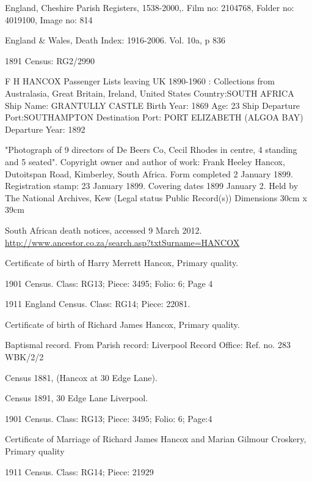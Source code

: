 \begin{thebibliography}{99}
	England, Cheshire Parish Registers, 1538-2000,.
	Film no: 2104768, Folder no: 4019100, Image no: 814
	
	England \& Wales, Death Index: 1916-2006.
	Vol. 10a, p 836
	
	 1891 Census: RG2/2990
	 
	F H HANCOX 
   	Passenger Lists leaving UK 1890-1960 : Collections from Australasia, Great Britain, Ireland, United States
	Country:SOUTH AFRICA
	Ship Name: GRANTULLY CASTLE
	Birth Year: 1869  Age: 23
	Ship Departure Port:SOUTHAMPTON
	Destination Port: PORT ELIZABETH (ALGOA BAY)
	Departure Year: 1892
	
	"Photograph of 9 directors of De Beers Co, Cecil Rhodes in centre, 4 standing and 5 seated".
	Copyright owner and author of work: Frank Heeley Hancox, Dutoitspan Road, Kimberley, South Africa.
	Form completed 2 January 1899. Registration stamp: 23 January 1899.
	Covering dates 1899 January 2. Held by The National Archives, Kew (Legal status Public Record(s))
	Dimensions 30cm x 39cm

	South African death notices, accessed 9 March 2012.
	\url{http://www.ancestor.co.za/search.asp?txtSurname=HANCOX}
	
	Certificate of birth of Harry Merrett Hancox, Primary quality.
	
	1901 Census. Class: RG13; Piece: 3495; Folio: 6; Page 4
	
	1911 England Census. Class: RG14; Piece: 22081.
	
	Certificate of birth of Richard James Hancox, Primary quality.
	
	 Baptismal record. From Parish record: Liverpool Record Office: Ref. no. 283 WBK/2/2
	 
	Census 1881, (Hancox at 30 Edge Lane).
	
	Census 1891, 30 Edge Lane Liverpool.

	1901 Census. Class: RG13; Piece: 3495; Folio: 6; Page:4

	 Certificate of Marriage of Richard James Hancox and Marian Gilmour Croskery, Primary quality
	 
	1911 Census. Class: RG14; Piece: 21929
	

\end{thebibliography}
